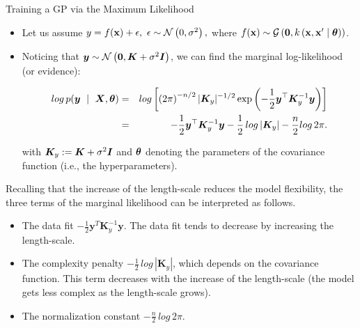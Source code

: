 \begin{frame}[c,allowframebreaks]{Training a GP via the Maximum Likelihood}

\begin{itemize}
\item Let us assume $y = f(\mathbf{x}) + \epsilon, ~ \epsilon \sim \mathcal{N}\left(0, \sigma^2\right),$ where $f(\mathbf{x}) \sim \mathcal{G}\left(\bm{0}, k\left(\mathbf{x}, \mathbf{x}^\prime \mid \bm{\theta} \right)\right)$.

\lz
\lz

\item Noticing that $\bm{y} \sim \mathcal{N}\left(\bm{0}, \bm{K} + \sigma^2 \boldsymbol{I}\right)$, we can find the marginal log-likelihood (or evidence):

\vspace{-5mm}

\begin{eqnarray*}
log\, p(\bm{y} ~\mid~ \bm{X}, \bm{\theta}) &=& log \left[\left(2 \pi\right)^{-n / 2} |\bm{K}_y|^{-1 / 2} \exp\left(- \frac{1}{2} \bm{y}^\top \bm{K}_y^{-1} \bm{y}\right) \right]\\
&=& -\frac{1}{2}\bm{y}^\top\bm{K}_y^{-1} \bm{y} - \frac{1}{2}\, log \left| \bm{K}_y \right| - \frac{n}{2} log\,2\pi.
\end{eqnarray*}

with $\bm{K}_y:=\bm{K} + \sigma^2 \boldsymbol{I}$ and $\bm{\theta}$ denoting the parameters of the covariance function (i.e., the hyperparameters).
\end{itemize}

\framebreak

Recalling that the increase of the length-scale reduces the model flexibility, the three terms of the marginal likelihood can be interpreted as follows.
\vspace{1cm}

\begin{itemize}
\item The data fit $-\frac{1}{2}\bm{y}^T\bm{K}_y^{-1} \bm{y}$. The data fit tends to decrease by increasing the length-scale.
\vspace{.5cm}

\item The complexity penalty $- \frac{1}{2}\,log\,\left| \bm{K}_y \right|$, which depends on the covariance function. This term decreases with the increase of the length-scale (the model gets less complex as the length-scale grows).
\vspace{.5cm}

\item The normalization constant $- \frac{n}{2}\,log\,2\pi$.
\end{itemize}


\end{frame}

